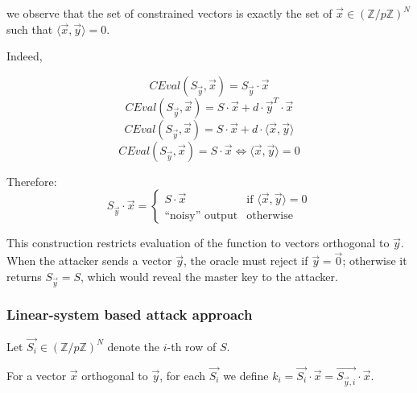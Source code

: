 \documentclass[9pt]{extarticle}
\begin{document}
we observe that the set of constrained vectors is exactly the set of
$\vec{x} \in (\mathbb{Z}/p\mathbb{Z})^N$ such that $\langle \vec{x},\vec{y} \rangle = 0$.

Indeed,

\[CEval(S_{\vec{y}}, \vec{x}) =  S_{\vec{y}} \cdot \vec{x}\]
\[CEval(S_{\vec{y}}, \vec{x}) =  S \cdot \vec{x} + d \cdot \vec{y}^T \cdot \vec{x}\]
\[CEval(S_{\vec{y}}, \vec{x}) =  S \cdot \vec{x} + d \cdot \langle \vec{x},\vec{y} \rangle\]
\[CEval(S_{\vec{y}}, \vec{x}) =  S \cdot \vec{x} \iff \langle \vec{x},\vec{y} \rangle = 0\]

Therefore:
\[
S_{\vec{y}} \cdot \vec{x} =
\begin{cases}
S \cdot \vec{x} & \text{if } \langle \vec{x}, \vec{y} \rangle = 0 \\
\text{``noisy'' output} & \text{otherwise}
\end{cases}
\]

This construction restricts evaluation of the function to vectors orthogonal to $\vec{y}$.
When the attacker sends a vector $\vec{y}$, the oracle must reject if $\vec{y} = \vec{0}$;
otherwise it returns $S_{\vec{y}} = S$, which would reveal the master key to the attacker.

\subsubsection{Linear-system based attack approach}

Let $\vec{S_i} \in (\mathbb{Z}/p\mathbb{Z})^N$ denote the $i$-th row of $S$.

For a vector $\vec{x}$ orthogonal to $\vec{y}$, for each $\vec{S_i}$ we define
$k_i = \vec{S_i} \cdot \vec{x} = \vec{S_{\vec{y},i}} \cdot \vec{x}$.
\end{document}
